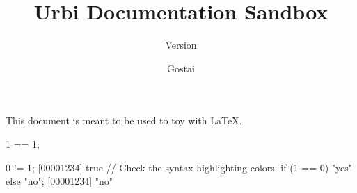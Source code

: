 \documentclass[openright,twoside,11pt]{book}
\title{Urbi Documentation Sandbox}
\subtitle{Version \VcsDescription}
\author{Gostai}
\begin{document}
This document is meant to be used to toy with \LaTeX.

\begin{urbiassert}
1 == 1;
\end{urbiassert}

\begin{urbiscript}
0 != 1;
[00001234] true
// Check the syntax highlighting colors.
if (1 == 0) "yes" else "no";
[00001234] "no"
\end{urbiscript}
\end{document}
